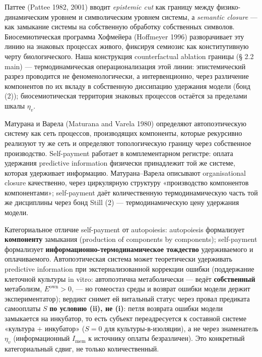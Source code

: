 \documentclass[pdflatex,sn-mathphys-ay]{sn-jnl}
\begin{document}
Паттее (Pattee 1982, 2001) вводит \emph{epistemic cut} как границу между физико-динамическим уровнем и символическим уровнем системы, а \emph{semantic closure} --- как замыкание системы на собственную обработку собственных символов. Биосемиотическая программа Хофмейера (Hoffmeyer 1996) разворачивает эту линию на знаковых процессах живого, фиксируя семиозис как конститутивную черту биологического. Наша конструкция counterfactual ablation границы (§ 2.2 main) --- термодинамическая операционализация этой линии: эпистемический разрез проводится не феноменологически, а интервенционно, через различение компонентов по их вкладу в собственную диссипацию удержания модели (бонд (2)); биосемиотическая территория знаковых процессов остаётся за пределами шкалы \(\eta_v\).

Матурана и Варела (Maturana and Varela 1980) определяют автопоэтическую систему как сеть процессов, производящих компоненты, которые рекурсивно реализуют ту же сеть и определяют топологическую границу через собственное производство. Self-payment работает в комплементарном регистре: оплата удержания predictive information физически принадлежит той же системе, которая удерживает информацию. Матурана--Варела описывают organisational closure качественно, через циркулярную структуру «производство компонентов компонентами»; self-payment даёт количественную термодинамическую часть той же дисциплины через бонд Still (2) --- термодинамическую цену удержания модели.

Категориальное отличие self-payment от autopoiesis: autopoiesis формализует \textbf{компоненту} замыкания (production of components by components); self-payment формализует \textbf{информационно-термодинамическое тождество} удерживаемого и оплачиваемого. Автопоэтическая система может теоретически удерживать predictive information при экстернализованной коррекции ошибки (поддержание клеточной культуры in vitro: автопоэтична метаболически --- ведёт \textbf{собственный} метаболизм, \(E^{\text{own}} > 0\), --- но гомеостаз среды и возврат ошибки модели держит экспериментатор); вердикт снимет ей витальный статус через провал предиката самооплаты \(S\) \textbf{по условию (ii), не (i)}: петля возврата ошибки модели замыкается на инкубатор, то есть субъект переадресуется к составной системе «культура + инкубатор» (\(S = 0\) для культуры-в-изоляции), а не через знаменатель \(\eta_v\) (информационный \(I_{\text{mem}}\) к источнику оплаты безразличен). Это конкретный категориальный сдвиг, не только количественный.
\end{document}
